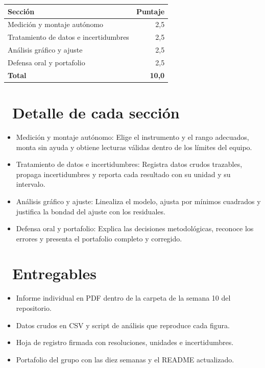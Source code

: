 \documentclass[11pt,a4paper]{article}
\newcommand{\iconotexto}[2]{\textcolor{cyanNeon}{\faIcon{#1}}~#2}
\begin{document}
\begin{tabularx}{\linewidth}{@{}X r@{}}
\toprule
Sección & Puntaje\\
\midrule
Medición y montaje autónomo & 2,5 \\
Tratamiento de datos e incertidumbres & 2,5 \\
Análisis gráfico y ajuste & 2,5 \\
Defensa oral y portafolio & 2,5 \\
\midrule
\textbf{Total} & \textbf{10,0}\\
\bottomrule
\end{tabularx}

\section{\iconotexto{list-ul}{Detalle de cada sección}}

\begin{itemize}[leftmargin=1.4em,itemsep=2pt,topsep=3pt]
  \item Medición y montaje autónomo: Elige el instrumento y el rango adecuados, monta sin ayuda y obtiene lecturas válidas dentro de los límites del equipo.
  \item Tratamiento de datos e incertidumbres: Registra datos crudos trazables, propaga incertidumbres y reporta cada resultado con su unidad y su intervalo.
  \item Análisis gráfico y ajuste: Linealiza el modelo, ajusta por mínimos cuadrados y justifica la bondad del ajuste con los residuales.
  \item Defensa oral y portafolio: Explica las decisiones metodológicas, reconoce los errores y presenta el portafolio completo y corregido.
\end{itemize}

\section{\iconotexto{box-open}{Entregables}}

\begin{itemize}[leftmargin=1.4em,itemsep=2pt,topsep=3pt]
  \item Informe individual en PDF dentro de la carpeta de la semana 10 del repositorio.
  \item Datos crudos en CSV y script de análisis que reproduce cada figura.
  \item Hoja de registro firmada con resoluciones, unidades e incertidumbres.
  \item Portafolio del grupo con las diez semanas y el README actualizado.
\end{itemize}
\end{document}
